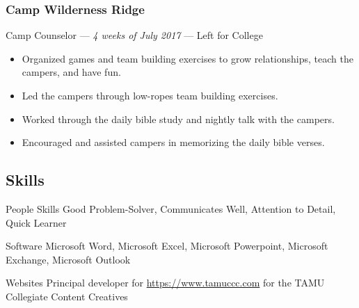 \documentclass[letterpaper,10pt]{article}
\begin{document}
\subsubsection{Camp Wilderness Ridge}
\hfill Camp Counselor --- \emph{4 weeks of July 2017} --- Left for College

\begin{itemize}
\tightlist{}
\item
	Organized games and team building exercises to grow relationships, teach the campers, and have fun.
\item
	Led the campers through low-ropes team building exercises.
\item
	Worked through the daily bible study and nightly talk with the campers.
\item
	Encouraged and assisted campers in memorizing the daily bible verses.	
\end{itemize}

\subsection{Skills}

\begin{skills}
\item[People Skills]
  Good Problem-Solver, Communicates Well, Attention to Detail, Quick Learner
\item[Software]
  Microsoft Word, Microsoft Excel, Microsoft Powerpoint, Microsoft Exchange, Microsoft Outlook
\item[Websites]
	Principal developer for \href{https://www.tamuccc.com}{https://www.tamuccc.com} for the TAMU Collegiate Content Creatives
\end{skills}
\end{document}
